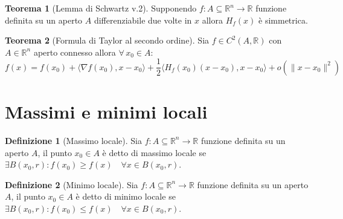 \documentclass[leqno]{article}
\theoremstyle{definition}
\newtheorem{definition}{Definizione}[section]
\numberwithin{equation}{section}
\newtheorem{theorem}{Teorema}[section]
\theoremstyle{remark}
\begin{document}
	\begin{theorem}[Lemma di Schwartz v.2]
		Supponendo $f:A\subseteq \mathbb{R}^n \rightarrow \mathbb{R}$ funzione definita su un aperto $A$ differenziabile due volte in $x$ allora $H_f(x)$ è simmetrica.
	\end{theorem}
	
	\begin{theorem}[Formula di Taylor al secondo ordine]
		Sia $f\in C^2(A,\mathbb{R})$ con $A\in \mathbb{R}^n$ aperto connesso allora $\forall \, x_0 \in A$:
		\begin{equation}
			f(x)=f(x_0)+\langle \nabla f(x_0), x-x_0\rangle + \frac{1}{2}\langle H_f(x_0)(x-x_0),x-x_0 \rangle + o(\lVert x-x_0 \rVert ^2)
		\end{equation}
	\end{theorem}
	
	\section{Massimi e minimi locali}
	
	\begin{definition}[Massimo locale]
		Sia $f:A\subseteq \mathbb{R}^n \rightarrow \mathbb{R}$ funzione definita su un aperto $A$, il punto $x_0 \in A$ è detto di massimo locale se $\exists B(x_0,r) : f(x_0)\ge f(x) \quad \forall x \in B(x_0,r)$.
	\end{definition}
	
	\begin{definition}[Minimo locale]
		Sia $f:A\subseteq \mathbb{R}^n \rightarrow \mathbb{R}$ funzione definita su un aperto $A$, il punto $x_0 \in A$ è detto di minimo locale se $\exists B(x_0,r) : f(x_0)\le f(x) \quad \forall x \in B(x_0,r)$.
	\end{definition}
	
\end{document}
